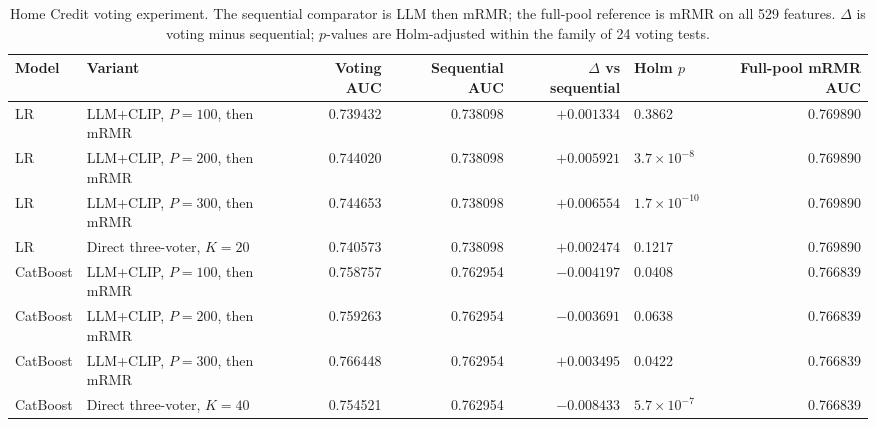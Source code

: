 \documentclass[preprint,12pt]{elsarticle}
\newcommand{\Kfeat}{K}
\begin{document}
\begin{table}
\centering
\scriptsize
\begin{threeparttable}
\caption{Home Credit voting experiment. The sequential comparator is LLM then mRMR; the full-pool reference is mRMR on all 529 features. $\Delta$ is voting minus sequential; $p$-values are Holm-adjusted within the family of 24 voting tests.}
\label{tab:voting}
\begin{tabular}{@{}llrrrlr@{}}
\toprule
Model & Variant & Voting AUC & Sequential AUC & $\Delta$ vs sequential & Holm $p$ & Full-pool mRMR AUC \\
\midrule
LR & LLM+CLIP, $P=100$, then mRMR & 0.739432 & 0.738098 & $+0.001334$ & 0.3862 & 0.769890 \\
LR & LLM+CLIP, $P=200$, then mRMR & 0.744020 & 0.738098 & $+0.005921$ & $3.7\times10^{-8}$ & 0.769890 \\
LR & LLM+CLIP, $P=300$, then mRMR & 0.744653 & 0.738098 & $+0.006554$ & $1.7\times10^{-10}$ & 0.769890 \\
LR & Direct three-voter, $\Kfeat=20$ & 0.740573 & 0.738098 & $+0.002474$ & 0.1217 & 0.769890 \\
CatBoost & LLM+CLIP, $P=100$, then mRMR & 0.758757 & 0.762954 & $-0.004197$ & 0.0408 & 0.766839 \\
CatBoost & LLM+CLIP, $P=200$, then mRMR & 0.759263 & 0.762954 & $-0.003691$ & 0.0638 & 0.766839 \\
CatBoost & LLM+CLIP, $P=300$, then mRMR & 0.766448 & 0.762954 & $+0.003495$ & 0.0422 & 0.766839 \\
CatBoost & Direct three-voter, $\Kfeat=40$ & 0.754521 & 0.762954 & $-0.008433$ & $5.7\times10^{-7}$ & 0.766839 \\
\bottomrule
\end{tabular}
\end{threeparttable}
\end{table}
\end{document}
